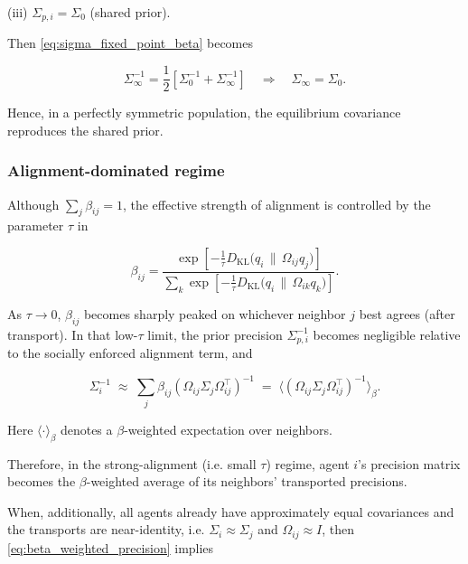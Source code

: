 \documentclass[twoside,11pt]{article}
\begin{document}
(iii) $\Sigma_{p,i} = \Sigma_0$ (shared prior).

Then \eqref{eq:sigma_fixed_point_beta} becomes

\begin{equation}
\Sigma_\infty^{-1}
=\frac{1}{2}
\left[
\Sigma_0^{-1}
+ \Sigma_\infty^{-1}
\right]
\quad\Longrightarrow\quad
\Sigma_\infty = \Sigma_0.
\end{equation}

Hence, in a perfectly symmetric population, the equilibrium covariance reproduces the shared prior.

\subsubsection{Alignment-dominated regime}

Although $\sum_j \beta_{ij} = 1$, the effective strength of alignment is controlled by the parameter $\tau$ in

\begin{equation}
\beta_{ij}
=\frac{
\exp\!\left[
-\frac{1}{\tau}
D_{\mathrm{KL}}\!\big(q_i \,\|\, \Omega_{ij} q_j\big)
\right]
}{\sum_k
\exp\!\left[
-\frac{1}{\tau}
D_{\mathrm{KL}}\!\big(q_i \,\|\, \Omega_{ik} q_k\big)
\right]}.
\end{equation}

As $\tau \to 0$, $\beta_{ij}$ becomes sharply peaked on whichever neighbor $j$ best agrees (after transport). In that low-$\tau$ limit, the prior precision $\Sigma_{p,i}^{-1}$ becomes negligible relative to the socially enforced alignment term, and

\begin{equation}
\boxed{
\Sigma_i^{-1}
\;\approx\;
\sum_j \beta_{ij}
(\Omega_{ij}\Sigma_j\Omega_{ij}^\top)^{-1}
\;=\;\big\langle(\Omega_{ij}\Sigma_j\Omega_{ij}^\top)^{-1}
\big\rangle_{\beta}.}
\label{eq:beta_weighted_precision}
\end{equation}

Here $\langle \cdot \rangle_{\beta}$ denotes a $\beta$-weighted expectation over neighbors.  

Therefore, in the strong-alignment (i.e. small $\tau$) regime, agent $i$’s precision matrix becomes the $\beta$-weighted average of its neighbors' transported precisions.

When, additionally, all agents already have approximately equal covariances and the transports are near-identity, i.e. $\Sigma_i \approx \Sigma_j$ and $\Omega_{ij} \approx I$, then \eqref{eq:beta_weighted_precision} implies
\end{document}
